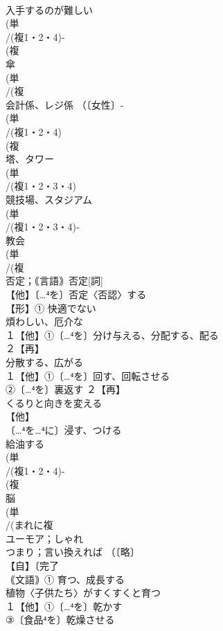 \documentclass[8pt]{extreport}
\begin{document}
\begin{CJK}{UTF8}{min}
\\	入手するのが難しい
\\	(単
\\	/(複1・2・4)-
\\	(複
\\	傘
\\	(単
\\	/(複
\\	会計係、レジ係 （〔女性〕-
\\	(単
\\	/(複1・2・4)
\\	(複
\\	塔、タワー 
\\	(単
\\	/(複1・2・3・4)
\\	競技場、スタジアム 
\\	(単
\\	/(複1・2・3・4)‐
\\	教会 
\\	(単
\\	/(複
\\	否定；｟言語｠否定[詞] 
\\	【他】〔…⁴を〕否定〈否認〉する 
\\	【形】① 快適でない 
\\	煩わしい、厄介な
\\	１【他】①〔…⁴を〕分け与える、分配する、配る 
\\	２【再】
\\	分散する、広がる
\\	１【他】①〔…⁴を〕回す、回転させる 
\\	②〔…⁴を〕裏返す ２【再】
\\	くるりと向きを変える
\\	【他】
\\	〔…⁴を…⁴に〕浸す、つける 
\\	給油する
\\	(単
\\	/(複1・2・4)-
\\	(複
\\	脳 
\\	(単
\\	/(まれに複
\\	ユーモア；しゃれ
\\	つまり；言い換えれば （〔略〕
\\	【自】〔完了
\\	｟文語｠① 育つ、成長する 
\\	植物〈子供たち〉がすくすくと育つ
\\	１【他】①〔…⁴を〕乾かす 
\\	③〔食品⁴を〕乾燥させる

\end{CJK}
\end{document}
